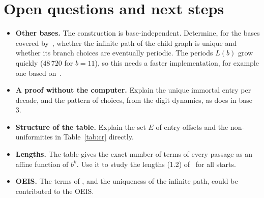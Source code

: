 \section{Open questions and next steps}
\label{sec:open}

\begin{itemize}
  \item \textbf{Other bases.} The construction is base-independent. Determine, for the bases covered
        by~\cite{dbts}, whether the infinite path of the child graph is unique and whether its
        branch choices are eventually periodic. The periods $L(b)$ grow quickly ($48\,720$ for
        $b = 11$), so this needs a faster implementation, for example one based on~\cite{dbtscode}.
  \item \textbf{A proof without the computer.} Explain the unique immortal entry per decade, and the
        pattern of choices, from the digit dynamics, as \cite[Theorem~10.1]{comma} does in base 3.
  \item \textbf{Structure of the table.} Explain the set $E$ of entry offsets and the
        non-uniformities in Table~\ref{tab:cr} directly.
  \item \textbf{Lengths.} The table gives the exact number of terms of every passage as an affine
        function of $b^k$. Use it to study the lengths (1.2) of~\cite{comma} for all starts.
  \item \textbf{OEIS.} The terms of , and the uniqueness of the infinite path, could be
        contributed to the OEIS.
\end{itemize}
